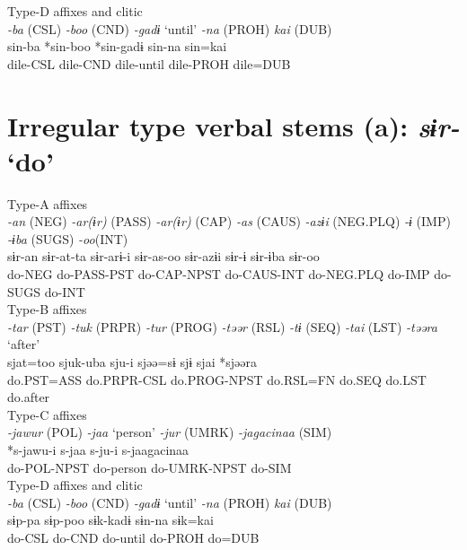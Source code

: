 \ex Type-D affixes and clitic\\
\glll \textit{-ba} (CSL)  \textit{-boo} (CND)  \textit{-gadɨ} ‘until’  \textit{-na} (PROH)  \textit{kai} (DUB)\\
sin-ba  *sin-boo  *sin-gadɨ  sin-na  sin=kai\\
dile-CSL  dile-CND  dile-until  dile-PROH  dile=DUB\\
\z

\section{Irregular type verbal stems (a): \textit{sɨr-} ‘do’}

\ea Type-A affixes\\
\glll \textit{-an} (NEG)  \textit{-ar(ɨr)} (PASS)  \textit{-ar(ɨr)} (CAP)  \textit{-as} (CAUS)  \textit{-azɨi} (NEG.PLQ)  \textit{-ɨ} (IMP)  \textit{-ɨba} (SUGS)  \textit{-oo}(INT)\\
sɨr-an  sɨr-at-ta  sɨr-arɨ-i  sɨr-as-oo  sɨr-azɨi  sɨr-ɨ  sɨr-ɨba  sɨr-oo\\
do-NEG  do-PASS-PST  do-CAP-NPST  do-CAUS-INT  do-NEG.PLQ  do-IMP  do-SUGS  do-INT\\


\ex Type-B affixes\\
\glll \textit{-tar} (PST)  \textit{-tuk} (PRPR)  \textit{-tur} (PROG)  \textit{-təər} (RSL)  \textit{-tɨ} (SEQ)  \textit{-tai} (LST)  \textit{-təəra} ‘after’\\
sjat=too  sjuk-uba  sju-i  sjəə=sɨ  sjɨ  sjai  *sjəəra\\
do.PST=ASS  do.PRPR-CSL  do.PROG-NPST  do.RSL=FN  do.SEQ  do.LST  do.after\\


\ex Type-C affixes\\
\glll \textit{-jawur} (POL)  \textit{-jaa} ‘person’  \textit{-jur} (UMRK)  \textit{-jagacinaa} (SIM)\\
*s-jawu-i  s-jaa  s-ju-i  s-jaagacinaa\\
do-POL-NPST  do-person  do-UMRK-NPST  do-SIM\\


\ex Type-D affixes and clitic\\
\glll \textit{-ba} (CSL)  \textit{-boo} (CND)  \textit{-gadɨ} ‘until’  \textit{-na} (PROH)  \textit{kai} (DUB)\\
sɨp-pa  sɨp-poo  sɨk-kadɨ  sɨn-na  sɨk=kai\\
do-CSL  do-CND  do-until  do-PROH  do=DUB\\
\z

